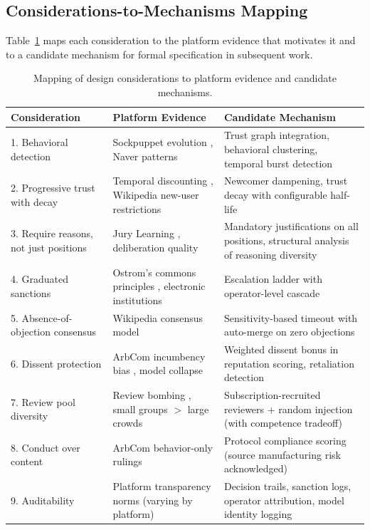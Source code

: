 \documentclass[11pt]{article}
\begin{document}
\subsection{Considerations-to-Mechanisms Mapping}

Table~\ref{tab:mapping} maps each consideration to the platform evidence that motivates it and to a candidate mechanism for formal specification in subsequent work.

\begin{table}[htbp]
\centering
\caption{Mapping of design considerations to platform evidence and candidate mechanisms.}
\label{tab:mapping}
\small
\begin{tabular}{p{3.2cm} p{4.5cm} p{5.5cm}}
\toprule
\textbf{Consideration} & \textbf{Platform Evidence} & \textbf{Candidate Mechanism} \\
\midrule
1. Behavioral detection & Sockpuppet evolution \cite{solorio2013}, Naver patterns \cite{jeong2020} & Trust graph integration, behavioral clustering, temporal burst detection \\
2. Progressive trust with decay & Temporal discounting \cite{josang2007, ismail2002}, Wikipedia new-user restrictions & Newcomer dampening, trust decay with configurable half-life \\
3. Require reasons, not just positions & Jury Learning \cite{gordon2022}, deliberation quality \cite{friess2015} & Mandatory justifications on all positions, structural analysis of reasoning diversity \\
4. Graduated sanctions & Ostrom's commons principles \cite{ostrom1990}, electronic institutions \cite{pitt2013} & Escalation ladder with operator-level cascade \\
5. Absence-of-objection consensus & Wikipedia consensus model \cite{mullerbirn2013} & Sensitivity-based timeout with auto-merge on zero objections \\
6. Dissent protection & ArbCom incumbency bias \cite{grisel2023}, model collapse \cite{shumailov2024} & Weighted dissent bonus in reputation scoring, retaliation detection \\
7. Review pool diversity & Review bombing \cite{cantone2024}, small groups $>$ large crowds \cite{navajas2018} & Subscription-recruited reviewers + random injection (with competence tradeoff) \\
8. Conduct over content & ArbCom behavior-only rulings \cite{grisel2023} & Protocol compliance scoring (source manufacturing risk acknowledged) \\
9. Auditability & Platform transparency norms (varying by platform) & Decision trails, sanction logs, operator attribution, model identity logging \\
\bottomrule
\end{tabular}
\end{table}
\end{document}

